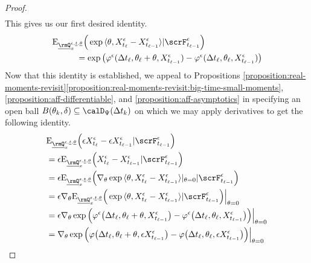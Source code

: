 \begin{proof}
\begin{align*}
  \end{align*}
  This gives us our first desired identity.
  \begin{equation*}
    \begin{aligned}[t]
      &\Exp_{\fddPrb^{\epsilon, \underline t, \underline\twistVar}_\stateVar}\Big( \exp\prj{\twistVar}{\Xee_{t_\ell}-\Xee_{t_{\ell-1}}} | \scrF^\epsilon_{t_{\ell-1}} \Big) \\
      &\hspace{1cm} = \exp\big(\affShift^\epsilon(\Delta t_\ell, \twistVar_\ell + \twistVar, \Xee_{t_{\ell-1}})-\affShift^\epsilon(\Delta t_\ell, \twistVar_\ell, \Xee_{t_{\ell-1}})\big)
    \end{aligned}
  \end{equation*}
  Now that this identity is established, we appeal to Propositions \ref{proposition:real-moments-revisit}\ref{proposition:real-moments-revisit:big-time-small-moments}, \ref{proposition:aff-differentiable}, and \ref{proposition:aff-asymptotics} in specifying an open ball $\ball{\twistVar_k}{\delta} \subseteq \momentSpace(\Delta t_k)$ on which we may apply derivatives to get the following identity.
  \begin{align*}
    &\Exp_{\fddPrb^{\epsilon, \underline t,\underline\twistVar}_\stateVar} \Big( \Xe_{t_\ell} - \Xe_{t_{\ell-1}} | \scrF^\epsilon_{t_{\ell-1}} \Big)  \\
    &= \epsilon \Exp_{\fddPrb^{\epsilon, \underline t,\underline\twistVar}_\stateVar} \Big( \Xee_{t_\ell} - \Xee_{t_{\ell-1}} | \scrF^\epsilon_{t_{\ell-1}} \Big)  \\
    &= \epsilon \Exp_{\fddPrb^{\epsilon, \underline t,\underline\twistVar}_\stateVar} \Big( \nabla_{\twistVar} \exp\prj{\twistVar}{\Xee_{t_\ell} - \Xee_{t_{\ell-1}}}|_{\twistVar=0} | \scrF^\epsilon_{t_{\ell-1}} \Big) \\
    &=\epsilon \nabla_{\twistVar} \Exp_{\fddPrb^{\epsilon, \underline t,\underline\twistVar}_\stateVar} \Big( \exp\prj{\twistVar}{\Xee_{t_\ell} - \Xee_{t_{\ell-1}}} | \scrF^\epsilon_{t_{\ell-1}} \Big) \Big|_{\twistVar=0}\\
    &= \epsilon \nabla_{\twistVar} \exp\Big(\affShift^\epsilon\big(\Delta t_\ell, \twistVar_\ell + \twistVar, \Xee_{t_{\ell-1}}\big)-\affShift^\epsilon\big(\Delta t_\ell, \twistVar_\ell, \Xee_{t_{\ell-1}}\big)\Big) \Big|_{\twistVar=0} \\
    &= \nabla_{\twistVar} \exp\Big(\affShift\big(\Delta t_\ell, \twistVar_\ell + \twistVar, \Xe_{t_{\ell-1}}\big)-\affShift\big(\Delta t_\ell, \twistVar_\ell, \Xe_{t_{\ell-1}}\big)\Big) \Big|_{\twistVar=0} \\

\end{align*}
\end{proof}
